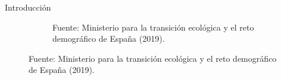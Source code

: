 \documentclass[spanish,a4paper]{beamer}%
\begin{document}
\begin{frame}{Introducción}
{\begin{figure}
\begin{subfigure}[b]{0.4\textwidth}
					\caption*{Fuente: Ministerio para la transición ecológica y el reto demográfico de España (2019).}
				\end{subfigure}
				\label{fig:demandaYconsumo}
			\end{figure}
		}
\end{frame}
\end{document}
